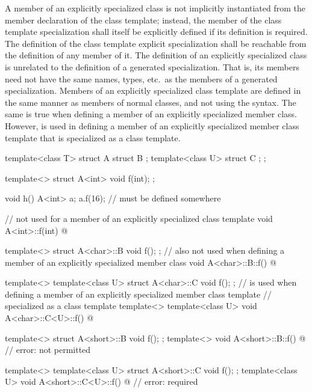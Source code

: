 \pnum
A member of an explicitly specialized class is not implicitly
instantiated from the member declaration of the class template;
instead, the member of the class template specialization shall itself be
explicitly defined if its definition is required.
The definition of the class template explicit specialization
shall be reachable from the definition of any member of it.
The definition of an explicitly specialized class is unrelated to the
definition of a generated specialization.
That is, its members need
not have the same names, types, etc.\ as the members of a generated
specialization.
Members of an explicitly specialized
class template are defined in the same manner as members of normal classes, and
not using the  syntax.
The same is true when defining a member of an explicitly specialized member
class. However,  is used in defining a member of an explicitly
specialized member class template that is specialized as a class template.
\begin{example}
\begin{codeblock}
template<class T> struct A {
  struct B { };
  template<class U> struct C { };
};

template<> struct A<int> {
  void f(int);
};

void h() {
  A<int> a;
  a.f(16);          //  must be defined somewhere
}

//  not used for a member of an explicitly specialized class template
void A<int>::f(int) { @\commentellip@ }

template<> struct A<char>::B {
  void f();
};
//  also not used when defining a member of an explicitly specialized member class
void A<char>::B::f() { @\commentellip@ }

template<> template<class U> struct A<char>::C {
  void f();
};
//  is used when defining a member of an explicitly specialized member class template
// specialized as a class template
template<>
template<class U> void A<char>::C<U>::f() { @\commentellip@ }

template<> struct A<short>::B {
  void f();
};
template<> void A<short>::B::f() { @\commentellip@ }              // error:  not permitted

template<> template<class U> struct A<short>::C {
  void f();
};
template<class U> void A<short>::C<U>::f() { @\commentellip@ }    // error:  required
\end{codeblock}
\end{example}

